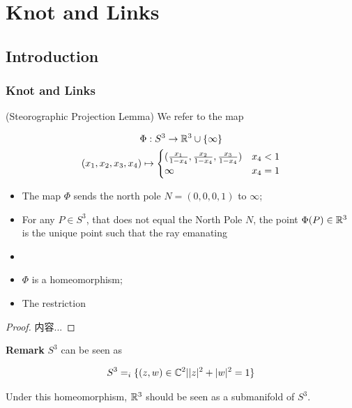 \documentclass[Total.tex]{subfiles}
\begin{document}
	\chapter{Knot and Links}
			
		\section{Introduction}
		
			\subsection{Knot and Links}
		
			\begin{lemma}
				(Steorographic Projection Lemma) We refer to the map
				
				\begin{gather*}
					\Phi:S^3\rightarrow \mathbb{R}^3\cup \{\infty\}\\
					(x_1,x_2,x_3,x_4)\mapsto 
					\begin{cases}
						(\frac{x_1}{1-x_4},\frac{x_2}{1-x_4},\frac{x_3}{1-x_4})&x_4<1\\
						\infty&x_4=1
					\end{cases}
				\end{gather*}
				
				\begin{itemize}
					\item The map $\Phi$ sends the north pole $N=(0,0,0,1)$ to $\infty$;
					\item For any $P\in S^3$, that does not equal the North Pole $N$, the point $\Phi(P)\in \mathbb{R}^3$ is the unique point such that the ray emanating 
					\item 
					\item $\Phi$ is a homeomorphism;
					\item The restriction 
				\end{itemize}
			\end{lemma}
			
			\begin{proof}
				内容...
			\end{proof}
			
			\textbf{Remark} $S^3$ can be seen as
			
			\begin{gather*}
				S^3=_i\{(z,w)\in \mathbb{C}^2||z|^2+|w|^2=1\}
			\end{gather*}
			
			Under this homeomorphism, $\mathbb{R}^3$ should be seen as a submanifold of $S^3$.
			
\end{document}

